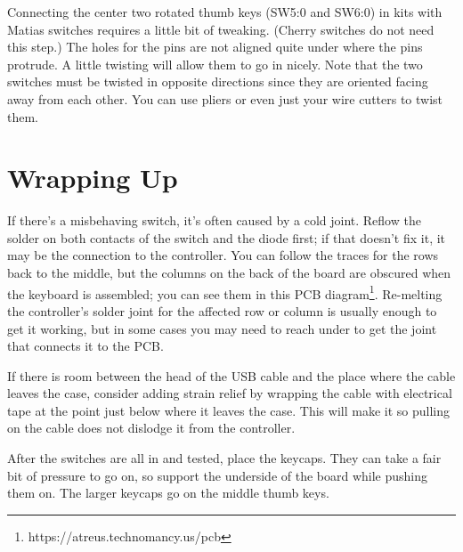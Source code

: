 \documentclass{article}
\begin{document}

Connecting the center two rotated thumb keys (SW5:0 and SW6:0) in kits
with Matias switches requires a little bit of tweaking. (Cherry
switches do not need this step.) The holes for the pins are not
aligned quite under where the pins protrude. A little twisting will
allow them to go in nicely. Note that the two switches must be twisted
in opposite directions since they are oriented facing away from each
other. You can use pliers or even just your wire cutters to twist
them.

\section{Wrapping Up}

If there's a misbehaving switch, it's often caused by a cold
joint. Reflow the solder on both contacts of the switch and the diode
first; if that doesn't fix it, it may be the connection to the
controller. You can follow the traces for the rows back to the middle,
but the columns on the back of the board are obscured when the
keyboard is assembled; you can see them in this PCB
diagram\footnote{https://atreus.technomancy.us/pcb}.
Re-melting the controller's solder joint for the affected row or
column is usually enough to get it working, but in some cases you may
need to reach under to get the joint that connects it to the PCB.

\vspace{1em}

If there is room between the head of the USB cable and the place where
the cable leaves the case, consider adding strain relief by wrapping
the cable with electrical tape at the point just below where it leaves
the case. This will make it so pulling on the cable does not dislodge
it from the controller.

\vspace{1em}

After the switches are all in and tested, place the keycaps. They can
take a fair bit of pressure to go on, so support the underside of the
board while pushing them on. The larger keycaps go on the middle thumb
keys.
\end{document}

